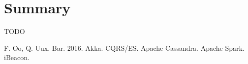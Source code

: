 \documentclass[a4paper, 10 pt, conference]{IEEEtran}
\begin{document}
\section{Summary}

TODO

\addtolength{\textheight}{-12cm}  %

\begin{thebibliography}{99}

 F. Oo, Q. Uux. Bar. 2016.
 Akka.
 CQRS/ES.
 Apache Cassandra.
 Apache Spark.
 iBeacon.

\end{thebibliography}
\end{document}

